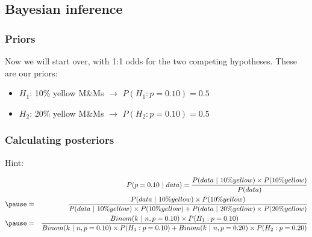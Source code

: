 \documentclass[slidestop,compress,mathserif,12pt,t,professionalfonts,xcolor=table]{beamer}
\begin{document}
\subsection{Bayesian inference}


\begin{frame}
\frametitle{Priors}

Now we will start over, with 1:1 odds for the two competing hypotheses. These are our priors:

\begin{itemize}
\item $H_1$: 10\% yellow M\&Ms $\rightarrow$ $P(H_1: p = 0.10) = 0.5$
\item $H_2$: 20\% yellow M\&Ms $\rightarrow$ $P(H_2: p = 0.10) = 0.5$
\end{itemize}

\end{frame}


\begin{frame}
\frametitle{Calculating posteriors}


\pause

\vfill

Hint:
\begin{adjustwidth}{-1in}{-1in}
{\scriptsize
\begin{eqnarray*}
&&P(p = 0.10~|~data) = \frac{P(data~|~10\% yellow) \times P(10\% yellow)}{P(data)} \\
\pause
&=& \frac{P(data~|~10\% yellow) \times P(10\% yellow)}{P(data~|~10\% yellow) \times P(10\% yellow) + P(data~|~20\% yellow) \times P(20\% yellow)} \\
\pause
&=& \frac{Binom(k~|~n, p = 0.10) \times P(H_1: p = 0.10)}{Binom(k~|~n, p = 0.10) \times P(H_1: p = 0.10) + Binom(k~|~n, p = 0.20) \times P(H_2: p = 0.20)} 
\end{eqnarray*}
}

\end{adjustwidth}

\end{frame}
\end{document}
